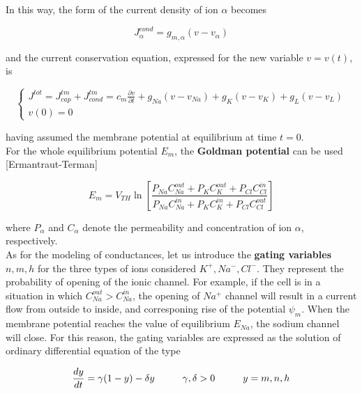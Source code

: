 \documentclass[a4paper]{article}
\begin{document}
	In this way, the form of the current density of ion $\alpha$ becomes
	
	
	\begin{equation}
	J_\alpha^{cond} = g_{m,\alpha}(v-v_\alpha)
	\end{equation}
	
	and the current conservation equation, expressed for the new variable $v = v(t)$, is
	
	\begin{equation}	
	\begin{cases}
	J^{tot} = J_{cap}^{tm} + J_{cond}^{tm} = c_m \frac{\partial v}{\partial t} + g_{Na}(v - v_{Na}) + g_{K}(v - v_{K}) +g_{L}(v - v_{L})  \\
	v(0) = 0
	\end{cases}	\end{equation}
	
	
	having assumed the membrane potential at equilibrium at time $t=0$.\\
	For the whole equilibrium potential $E_m$, the \textbf{Goldman potential} can be used [Ermantraut-Terman]
	
	
	\begin{equation}
	E_m= V_{TH} \ln \left[\frac{P_{Na} C_{Na}^{out} + P_{K} C_K^{out} + P_{Cl} C_{Cl}^{in}}{P_{Na} C_{Na}^{in} + P_{K} C_K^{in} + P_{Cl} C_{Cl}^{out}}\right]
	\end{equation}
	
	where $P_\alpha$ and $C_\alpha$  denote the permeability and concentration of ion $\alpha$, respectively.\\
	As for the modeling of conductances, let us introduce the \textbf{gating variables} $n,m,h$ for the three types of ions considered $K^+,Na^-,Cl^-$. They represent the probability of opening of the ionic channel. For example, if the cell is in a situation in which $C_{Na}^{out} > C_{Na}^{in}$, the opening of $Na^+$ channel will result in a current flow from outside to inside, and corresponing rise of the potential $\psi_m$. When the membrane potential reaches the value of equilibrium $E_{Na}$, the sodium channel will close. For this reason, the gating variables are expressed as the solution of ordinary differential equation of the type
	
		\begin{equation}
	\frac{dy}{dt} = \gamma (1-y) - \delta y \hspace{1 cm} \gamma,\delta >0  \hspace{1 cm} y = m,n,h
	\end{equation}
	
\end{document}
